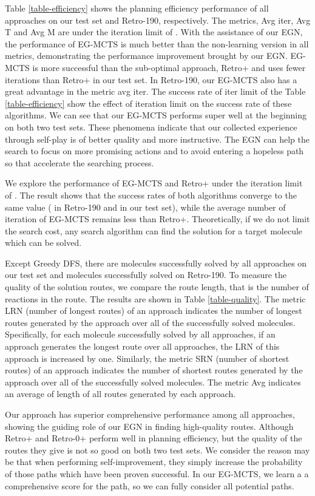 \documentclass[sn-mathphys,Numbered]{sn-jnl}
\begin{document}
Table \ref{table-efficiency} shows the planning efficiency performance of all approaches on our test set and Retro-190, respectively. The metrics, Avg iter, Avg T and Avg M are under the iteration limit of . 
With the assistance of our EGN, the performance of EG-MCTS is much better than the non-learning version in all metrics, demonstrating the performance improvement brought by our EGN.
EG-MCTS is  more successful than the sub-optimal approach, Retro+ and uses  fewer iterations than Retro+ in our test set. In Retro-190, our EG-MCTS also has a great advantage in the metric avg iter. 
The success rate of iter limit of the Table \ref{table-efficiency} show the effect of iteration limit on the success rate of these algorithms. We can see that our EG-MCTS performs super well at the beginning on both two test sets. These phenomena indicate that our collected experience through self-play is of better quality and more instructive. The EGN can help the search to focus on more promising actions and to avoid entering a hopeless path so that accelerate the searching process. 

We explore the performance of EG-MCTS and Retro+ under the iteration limit of . The result shows that the success rates of both algorithms converge to the same value ( in Retro-190 and  in our test set), while the average number of iteration of EG-MCTS remains less than Retro+. Theoretically, if we do not limit the search cost, any search algorithm can find the solution for a target molecule which can be solved. 


Except Greedy DFS, there are  molecules successfully solved by all approaches on our test set and  molecules successfully solved on Retro-190.
To measure the quality of the solution routes, we compare the route length, that is the number of reactions in the route. The results are shown in Table \ref{table-quality}. 
The metric LRN (number of longest routes) of an approach indicates the number of longest routes generated by the approach over all of the successfully solved molecules. 
 Specifically, for each molecule successfully solved by all approaches, if an approach generates the longest route over all approaches, the LRN of this approach is increased by one. Similarly,
the metric SRN (number of shortest routes) of an approach indicates the number of shortest routes generated by the approach over all of the successfully solved molecules. 
 The metric Avg indicates an average of length of all routes generated by each approach.


Our approach has superior comprehensive performance among all approaches, showing the guiding role of our EGN in finding high-quality routes.
Although Retro+ and Retro-0+ perform well in planning efficiency, but the quality of the routes they give is not so good on both two test sets. 
We consider the reason may be that when performing self-improvement, they simply increase the probability of those paths which have been proven successful. In our EG-MCTS, we learn a a comprehensive score for the path, so we can fully consider all potential paths.
\end{document}
